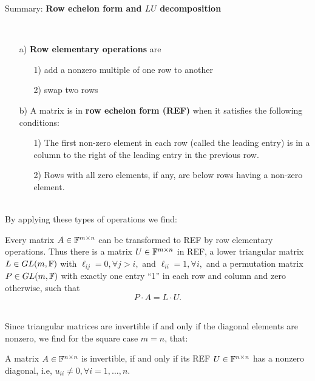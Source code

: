 \begin{frame}
	Summary: 
	{\bf \large Row echelon form and $LU$ decomposition} ~\\
	\begin{defi}[REF] 
		~\\
		\begin{itemize} 
		\item[a)] \textbf{Row elementary operations} are 
		\begin{itemize}
		\item[1)] add a nonzero multiple of one row to another
		\item[2)] swap two rows
		\end{itemize}
		\item[b)] A matrix is in \textbf{row echelon form (REF)} when it satisfies the following conditions:
		\begin{itemize}
		\item[1)] The first non-zero element in each row (called the leading entry) is in a column to the right of the leading entry in the previous row.
		\item[2)] Rows with all zero elements, if any, are below rows having a non-zero element.
		\end{itemize}
		\end{itemize}
	\end{defi}
	~\\
	By applying these types of operations we find: \vspace{-0.2cm}
	\begin{theo}[LU Decomposition]\label{REF}
		Every matrix $A\in{\mathbb{F}}^{m\times n}$ can be transformed to REF by row elementary operations. Thus there is a matrix $U\in{\mathbb{F}}^{m\times n}$ in REF, a lower triangular matrix $L\in GL(m,{\mathbb{F}})$ with $\ell_{ij}=0,\forall j>i,$ and $\ell_{ii}=1,\forall i,$ and a permutation matrix $P\in GL(m,{\mathbb{F}})$ with exactly one entry ``1'' in each row and column and zero otherwise, such that
		\[
		P\cdot A=L\cdot U.
		\]
	\end{theo}
	~\\
	Since triangular matrices are invertible if and only if the diagonal elements are nonzero, we find for the square case $m=n$, that:\vspace{-0.2cm}
	\begin{corollary}[Invertibility of $A$]\label{corREF}
	A matrix $A\in{\mathbb{F}}^{n\times n}$ is invertible, if and only if its REF $U\in{\mathbb{F}}^{n\times n}$ has a nonzero diagonal, i.e, $u_{ii}\neq 0, \forall i=1,\ldots ,n$.
	\end{corollary}
\end{frame}



